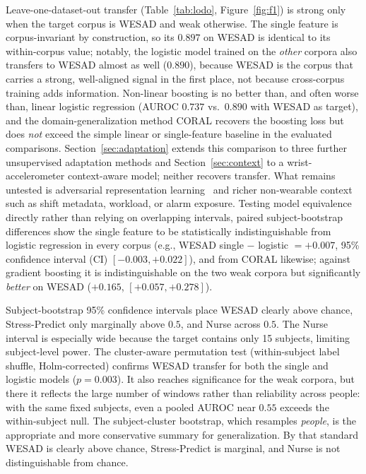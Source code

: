 \documentclass[healthcare,article,submit,moreauthors,pdftex]{Definitions/mdpi}
\begin{document}
Leave-one-dataset-out transfer (Table~\ref{tab:lodo}, Figure~\ref{fig:f1}) is
strong only when the target corpus is WESAD and weak otherwise. The single feature
is corpus-invariant by construction, so its $0.897$ on WESAD is identical to its
within-corpus value; notably, the logistic model trained on the \emph{other}
corpora also transfers to WESAD almost as well ($0.890$), because WESAD is the
corpus that carries a strong, well-aligned signal in the first place, not because
cross-corpus training adds information. Non-linear boosting is no better than,
and often worse than, linear logistic regression (AUROC $0.737$ vs.\ $0.890$ with
WESAD as target), and the domain-generalization method CORAL recovers the boosting
loss but does \emph{not} exceed the simple linear or single-feature baseline in
the evaluated comparisons. Section~\ref{sec:adaptation} extends this comparison to
three further unsupervised adaptation methods and Section~\ref{sec:context} to a
wrist-accelerometer context-aware model; neither recovers transfer. What remains
untested is adversarial representation learning~\cite{ganin2016dann} and richer
non-wearable context such as shift metadata, workload, or alarm exposure.
Testing model equivalence directly rather than relying on overlapping intervals,
paired subject-bootstrap differences show the single feature to be statistically
indistinguishable from logistic regression in every corpus (e.g., WESAD single
$-$ logistic $=+0.007$, 95\% confidence interval (CI)
$[-0.003,+0.022]$), and from CORAL likewise;
against gradient boosting it is indistinguishable on the two weak corpora but
significantly \emph{better} on WESAD ($+0.165$, $[+0.057,+0.278]$).

Subject-bootstrap 95\% confidence intervals place WESAD clearly above chance,
Stress-Predict only marginally above $0.5$, and Nurse across $0.5$. The Nurse
interval is especially wide because the target contains only 15 subjects,
limiting subject-level power. The cluster-aware permutation test
(within-subject label shuffle,
Holm-corrected) confirms WESAD transfer for both the single and logistic models
($p=0.003$). It also reaches significance for the weak corpora, but there it
reflects the large number of windows rather than reliability across people: with
the same fixed subjects, even a pooled AUROC near $0.55$ exceeds the
within-subject null. The subject-cluster bootstrap, which resamples \emph{people},
is the appropriate and more conservative summary for generalization. By that
standard WESAD is clearly above chance, Stress-Predict is marginal, and Nurse is
not distinguishable from chance.
\end{document}
